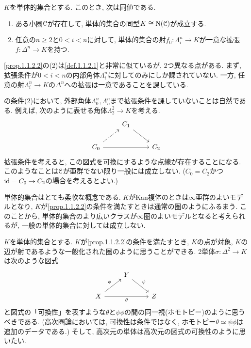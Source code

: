 \documentclass[uplatex, a4paper, 14Q, dvipdfmx]{jsreport}
\begin{document}
\begin{proposition} \label{prop.1.1.2.2}
  $K$を単体的集合とする. 
  このとき, 次は同値である. 
  \begin{enumerate}
    \item ある小圏$\mathcal{C}$が存在して, 単体的集合の同型$K \cong \mathrm{N}(\mathcal{C})$が成立する. 
    \item 任意の$n \geq 2$と$0<i<n$に対して, 単体的集合の射$f_0 : \Lambda^n_i \to K$が一意な拡張$f : \Delta^n \to K$を持つ.
  \end{enumerate}
\end{proposition}

\cref{prop.1.1.2.2}の(2)は\cref{def.1.1.2.1}と非常に似ているが, 2つ異なる点がある.
まず, 拡張条件が$0<i<n$の内部角体$\Lambda^n_i$に対してのみにしか課されていない. 
一方, 任意の射$\Lambda^n_i \to K$の$\Delta^n$への拡張は一意であることを課している. 

\begin{remark} \label{rem.1.1.2.3}
  の条件(2)において, 外部角体$\Lambda^n_0,\Lambda^n_n$まで拡張条件を課していないことは自然である.
  例えば, 次のように表せる角体$\Lambda^2_2 \to K$を考える. 
  \[\begin{tikzcd}
    & {C_1} \\
    {C_0} && {C_2}
    \arrow[from=1-2, to=2-3]
    \arrow[dashed, from=2-1, to=1-2]
    \arrow[from=2-1, to=2-3]
  \end{tikzcd}\]
  拡張条件を考えると, この図式を可換にするような点線が存在することになる.
  このようなことは$\mathcal{C}$が亜群でない限り一般には成立しない. ($C_0=C_2$かつ$\mathrm{id} = C_0 \to C_2$の場合を考えるとよい.)
\end{remark}

単体的集合はとても柔軟な概念である. 
$K$がKan複体のときは$\infty$亜群のよいモデルとなり, $K$が\cref{prop.1.1.2.2}の条件を満たすときは通常の圏のようにふるまう.
このことから, 単体的集合のより広いクラスが$\infty$圏のよいモデルとなると考えられるが, 一般の単体的集合に対しては成立しない.

$K$を単体的集合とする.
$K$が\cref{prop.1.1.2.2}の条件を満たすとき, $K$の点が対象, $K$の辺が射であるような一般化された圏のように思うことができる. 
2単体$\sigma : \Delta^2 \to K$は次のような図式
\[\begin{tikzcd}
	& Y \\
	X && Z
	\arrow["\psi", from=1-2, to=2-3]
	\arrow["\phi", from=2-1, to=1-2]
	\arrow["\theta"', from=2-1, to=2-3]
\end{tikzcd}\]
と図式の「可換性」を表すような$\theta$と$\psi\phi$の間の同一視(ホモトピー)のように思うべきである.
(高次圏論においては, 可換性は条件ではなく, ホモトピー$\theta \simeq \psi\phi$は追加のデータである.)
そして, 高次元の単体は高次元の図式の可換性のように思いたい. 
\end{document}
